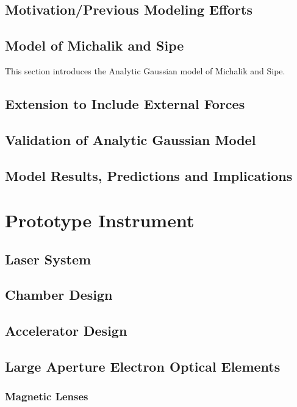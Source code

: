 \documentclass{uicthesi}
\begin{document}
\section{Motivation/Previous Modeling Efforts}

\section{Model of Michalik and Sipe}

This section introduces the Analytic Gaussian model of Michalik and Sipe.\cite{michalik_analytic_2006}

\section{Extension to Include External Forces}

\section{Validation of Analytic Gaussian Model}

\section{Model Results, Predictions and Implications}

\chapter{Prototype Instrument}

\section{Laser System}

\section{Chamber Design}

\section{Accelerator Design}

\section{Large Aperture Electron Optical Elements}

\subsection{Magnetic Lenses}
\end{document}
